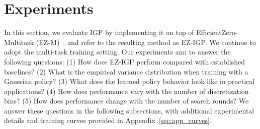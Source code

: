 \section{Experiments}
\label{sec:exp}

In this section, we evaluate IGP by implementing it on top of EfficientZero-Multitask (EZ-M)~\citep{liu2026scaling}, and refer to the resulting method as EZ-IGP. We continue to adopt the multi-task training setting. Our experiments aim to answer the following questions: (1) How does EZ-IGP perform compared with established baselines? (2) What is the empirical variance distribution when training with a Gaussian policy? (3) What does the learned policy behavior look like in practical applications? (4) How does performance vary with the number of discretization bins? (5) How does performance change with the number of search rounds? We answer these questions in the following subsections, with additional experimental details and training curves provided in Appendix~\ref{sec:app_curves}.




